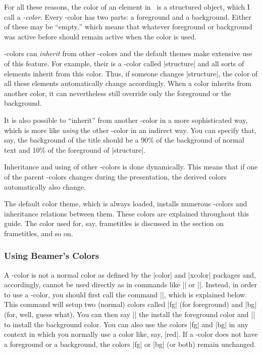 For all these reasons, the color of an element in \beamer\ is a
structured object, which I call a \emph{\beamer-color}. Every
\beamer-color has two parts: a foreground and a background. Either of
these may be ``empty,'' which means that whatever foreground or
background was active before should remain active when the color is
used.

\beamer-colors can \emph{inherit} from other \beamer-colors and the
default themes make extensive use of this feature. For example, their
is a \beamer-color called |structure| and all sorts of elements
inherit from this color. Thus, if someone changes |structure|, the
color of all these elements automatically change accordingly. When a
color inherits from another color, it can nevertheless still override
only the foreground or the background.

It is also possible to ``inherit'' from another \beamer-color in a more
sophisticated way, which is more like \emph{using} the other
\beamer-color in an indirect way. You can specify that, say, the
background of the title should be a 90\% of the background of normal
text and 10\% of the foreground of |structure|.

Inheritance and using of other \beamer-colors is done
dynamically. This means that if one of the parent \beamer-colors
changes during the presentation, the derived colors automatically also
change.

The default color theme, which is always loaded, installs numerous
\beamer-colors and inheritance relations between them. These colors
are explained throughout this guide. The color used for, say,
frametitles is discussed in the section on frametitles, and so on.  


\subsubsection{Using Beamer's Colors}

A \beamer-color is not a normal color as defined by the |color| and
|xcolor| packages and, accordingly, cannot be used directly as in
commands like |\color| or ||. Instead, in order to use a
\beamer-color, you should first call the command |\usebeamercolor|,
which is explained below. This command will setup two (normal) colors
called |fg| (for foreground) and |bg| (for, well, guess what). You can
then say |\color{fg}| the install the foreground color and
|\color{bg}| to install the background color. You can also use the
colors |fg| and |bg| in any context in which you normally use a color
like, say, |red|. If a \beamer-color does not have a foreground or a
background, the colors |fg| or |bg| (or both) remain unchanged. 

